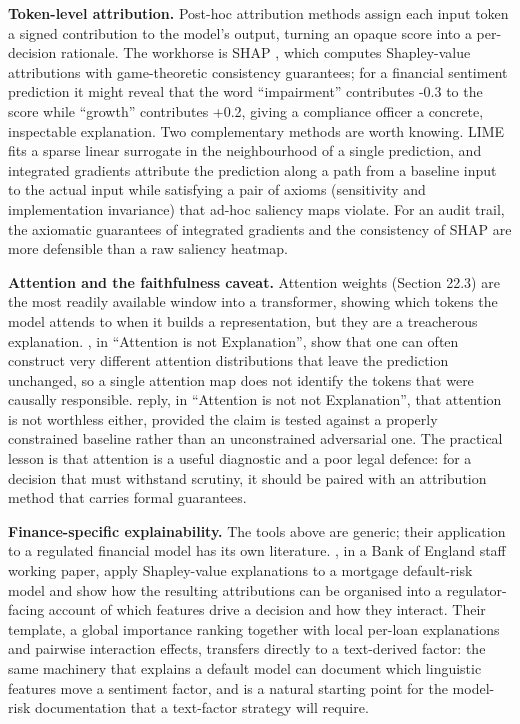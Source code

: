 \textbf{Token-level attribution.} Post-hoc attribution methods assign each input token a signed contribution to the model's output, turning an opaque score into a per-decision rationale. The workhorse is SHAP \citep{lundberg2017unified}, which computes Shapley-value attributions with game-theoretic consistency guarantees; for a financial sentiment prediction it might reveal that the word ``impairment'' contributes -0.3 to the score while ``growth'' contributes +0.2, giving a compliance officer a concrete, inspectable explanation. Two complementary methods are worth knowing. LIME \citep{ribeiro2016should} fits a sparse linear surrogate in the neighbourhood of a single prediction, and integrated gradients \citep{sundararajan2017axiomatic} attribute the prediction along a path from a baseline input to the actual input while satisfying a pair of axioms (sensitivity and implementation invariance) that ad-hoc saliency maps violate. For an audit trail, the axiomatic guarantees of integrated gradients and the consistency of SHAP are more defensible than a raw saliency heatmap.

\textbf{Attention and the faithfulness caveat.} Attention weights (Section 22.3) are the most readily available window into a transformer, showing which tokens the model attends to when it builds a representation, but they are a treacherous explanation. \cite{jain2019attention}, in ``Attention is not Explanation'', show that one can often construct very different attention distributions that leave the prediction unchanged, so a single attention map does not identify the tokens that were causally responsible. \cite{wiegreffe2019attention} reply, in ``Attention is not not Explanation'', that attention is not worthless either, provided the claim is tested against a properly constrained baseline rather than an unconstrained adversarial one. The practical lesson is that attention is a useful diagnostic and a poor legal defence: for a decision that must withstand scrutiny, it should be paired with an attribution method that carries formal guarantees.

\textbf{Finance-specific explainability.} The tools above are generic; their application to a regulated financial model has its own literature. \cite{bracke2019machine}, in a Bank of England staff working paper, apply Shapley-value explanations to a mortgage default-risk model and show how the resulting attributions can be organised into a regulator-facing account of which features drive a decision and how they interact. Their template, a global importance ranking together with local per-loan explanations and pairwise interaction effects, transfers directly to a text-derived factor: the same machinery that explains a default model can document which linguistic features move a sentiment factor, and is a natural starting point for the model-risk documentation that a text-factor strategy will require.

